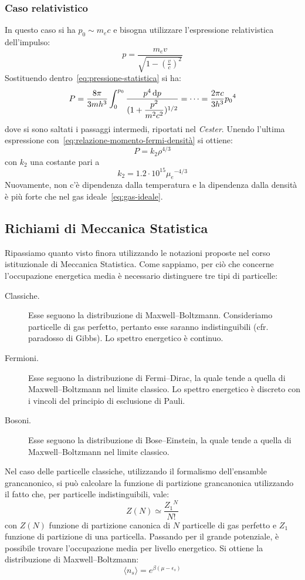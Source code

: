 \subsubsection{Caso relativistico}
In questo caso si ha $p_0 \sim m_e c$ e bisogna utilizzare l'espressione relativistica dell'impulso:
\[
p= \dfrac{m_e v}{\sqrt{1- (\frac{v}{c})^2}}
\]
Sostituendo dentro~\eqref{eq:pressione-statistica} si ha:
\[
P = \dfrac{8\pi}{3mh^3} \int_0^{p_0} \dfrac{p^4 \mathop{\mathrm{{}d}}\mathopen{} p}{(1 + \dfrac{p^2}{m^2c^2})^{1/2}} = \dots = \dfrac{2\pi c}{3h^3}{p_0}^4
\]
dove si sono saltati i passaggi intermedi, riportati nel \emph{Cester}. Unendo l'ultima espressione con~\eqref{eq:relazione-momento-fermi-densità} si ottiene:
\begin{equation}\label{eq:pressione-degenerazione-relativistica}
    P = k_2 \rho^{4/3}
\end{equation}
con $k_2$ una costante pari a
\[
k_2 = 1.2 \cdot 10^{15} {\mu_e}^{-4/3}
\]
Nuovamente, non c'è dipendenza dalla temperatura e la dipendenza dalla densità è più forte che nel gas ideale~\eqref{eq:gas-ideale}.

\subsection{Richiami di Meccanica Statistica}
Ripassiamo quanto visto finora utilizzando le notazioni proposte nel corso istituzionale di Meccanica Statistica. Come sappiamo, per ciò che concerne l'occupazione energetica media è necessario distinguere tre tipi di particelle:
\begin{description}
\item[Classiche.] Esse seguono la distribuzione di Maxwell--Boltzmann. Consideriamo particelle di gas perfetto, pertanto esse saranno indistinguibili (cfr. paradosso di Gibbs). Lo spettro energetico è continuo.
\item[Fermioni.] Esse seguono la distribuzione di Fermi--Dirac, la quale tende a quella di Maxwell--Boltzmann nel limite classico. Lo spettro energetico è discreto con i vincoli del principio di esclusione di Pauli. 
\item[Bosoni.] Esse seguono la distribuzione di Bose--Einstein, la quale tende a quella di Maxwell--Boltzmann nel limite classico.
\end{description}

Nel caso delle particelle classiche, utilizzando il formalismo dell'ensamble grancanonico, si può calcolare la funzione di partizione grancanonica utilizzando il fatto che, per particelle indistinguibili, vale:
\[
Z(N) \simeq \frac{{Z_1}^N}{N!}
\]
con $Z(N)$ funzione di partizione canonica di $N$ particelle di gas perfetto e $Z_1$ funzione di partizione di una particella. Passando per il grande potenziale, è possibile trovare l'occupazione media per livello energetico. Si ottiene la distribuzione di Maxwell--Boltzmann:\
\begin{equation}
    \langle n_s  \rangle = e^{\beta(\mu - \epsilon_s)} 
\end{equation}

